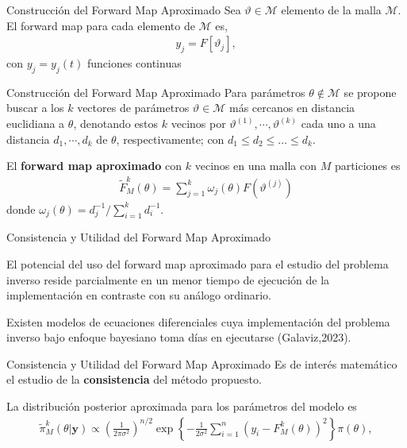 \documentclass[10pt,aspectratio=169]{beamer}
\begin{document}
\begin{frame}{Construcción del Forward Map Aproximado}
  Sea $\vartheta \in \mathcal{M} $ elemento de la malla $\mathcal{M}$. El forward map para cada elemento de $\mathcal{M}$ es, 
  \begin{align*}
    y_j = F[\vartheta_j],
  \end{align*}
  con $y_j = y_j(t)$ funciones continuas
  
  
\end{frame}

\begin{frame}{Construcción del Forward Map Aproximado}
  Para parámetros $\theta \notin \mathcal{M}$ se propone buscar a los $k$ vectores de parámetros $\vartheta \in \mathcal{M}$ más cercanos en distancia euclidiana a $\theta$, denotando estos $k$ vecinos por $\vartheta^{(1)}, \cdots, \vartheta^{(k)}$ cada uno a una distancia $d_1, \cdots, d_k$ de $\theta$, respectivamente; con $d_1 \leq d_2 \leq \dots \leq d_k$. 
  
  \vspace{0.5 cm}

  El \textbf{forward map aproximado} con $k$ vecinos en una malla con $M$ particiones es
  \begin{align}
    \tilde{F}^{k}_M(\theta) = \sum_{j = 1}^{k} \omega_j(\theta) F \left(\vartheta^{(j)}\right)
    \label{2.4.01}
  \end{align}
  donde $\omega_j(\theta) = d_j^{-1}/ \sum_{i=1}^{k} d_i^{-1}$.
\end{frame}

\begin{frame}{Consistencia y Utilidad del Forward Map Aproximado}

  El potencial del uso del forward map aproximado para el estudio del problema inverso reside parcialmente en un menor tiempo de ejecución de la implementación en contraste con su análogo ordinario. 

  \vspace{0.5 cm}

  Existen modelos de ecuaciones diferenciales cuya implementación del problema inverso bajo enfoque bayesiano toma días en ejecutarse (Galaviz,2023).

  
\end{frame}


\begin{frame}{Consistencia y Utilidad del Forward Map Aproximado}
  Es de interés matemático el estudio de la \textbf{consistencia} del método propuesto.
  
  \vspace{0.5 cm}

  La distribución posterior aproximada para los parámetros del modelo es
  \begin{align}
    \tilde{\pi}^{k}_M(\theta|\mathbf{y}) \propto \left(\frac{1}{2\pi \sigma^2}\right) ^{n/2}\exp \left \{  -\frac{1}{2\sigma^2}\sum_{i = 1}^{n} \left(y_i - F^k_M(\theta)\right)^2 \right \}\pi(\theta),
    \label{2.4.02}
  \end{align}
\end{frame}
\end{document}
